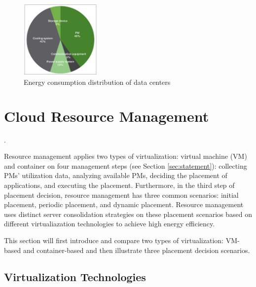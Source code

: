 
\begin{figure}
	\centering
		\includegraphics[width=0.35\textwidth]{pics/energyConsumption.png}
		\caption{Energy consumption distribution of data centers \cite{Rong:2016js}}
		\label{fig:consumption}

\end{figure} 

\section{Cloud Resource Management}
\label{sec:resource_management}
 \cite{Jennings:2015ht}.

Resource management applies two types of virtualization: virtual machine (VM) and container on four management steps (see Section \ref{sec:statement}): collecting PMs' utilization data, analyzing available PMs, deciding the placement of applications, and executing the placement. Furthermore, in the third step of placement decision, resource management has three common scenarios: initial placement, periodic placement, and dynamic placement. Resource management uses distinct server consolidation strategies on these placement scenarios based on different virtualiazation technologies to achieve high energy efficiency. 

This section will first introduce and compare two types of virtualization: VM-based and container-based and then illustrate 
three placement decision scenarios. 

\subsection{Virtualization Technologies}
\label{sec:virtualization}

